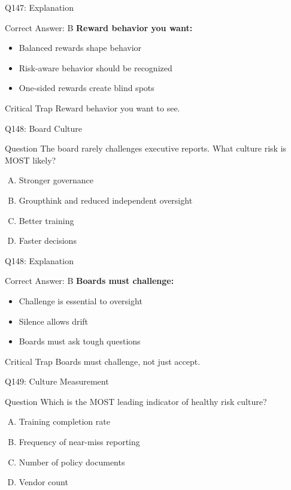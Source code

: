 \documentclass{beamer}
\begin{document}
	\begin{frame}{Q147: Explanation}
		\begin{block}{Correct Answer: B}
			\textbf{Reward behavior you want:}
			\begin{itemize}
				\item Balanced rewards shape behavior
				\item Risk-aware behavior should be recognized
				\item One-sided rewards create blind spots
			\end{itemize}
		\end{block}
		\begin{alertblock}{Critical Trap}
			Reward behavior you want to see.
		\end{alertblock}
	\end{frame}
	
	\begin{frame}{Q148: Board Culture}
		\begin{block}{Question}
			The board rarely challenges executive reports. What culture risk is MOST likely?
		\end{block}
		\begin{enumerate}[(A)]
			\item Stronger governance
			\item Groupthink and reduced independent oversight
			\item Better training
			\item Faster decisions
		\end{enumerate}
	\end{frame}
	
	\begin{frame}{Q148: Explanation}
		\begin{block}{Correct Answer: B}
			\textbf{Boards must challenge:}
			\begin{itemize}
				\item Challenge is essential to oversight
				\item Silence allows drift
				\item Boards must ask tough questions
			\end{itemize}
		\end{block}
		\begin{alertblock}{Critical Trap}
			Boards must challenge, not just accept.
		\end{alertblock}
	\end{frame}
	
	\begin{frame}{Q149: Culture Measurement}
		\begin{block}{Question}
			Which is the MOST leading indicator of healthy risk culture?
		\end{block}
		\begin{enumerate}[(A)]
			\item Training completion rate
			\item Frequency of near-miss reporting
			\item Number of policy documents
			\item Vendor count
		\end{enumerate}
	\end{frame}
	
\end{document}
